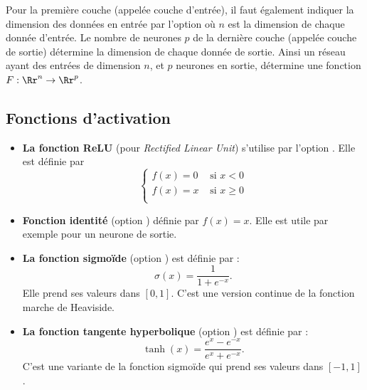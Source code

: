 \documentclass[11pt,class=report,crop=false]{standalone}
\begin{document}
Pour la première couche (appelée couche d'entrée), il faut également indiquer la dimension des données en entrée par l'option  où $n$ est la dimension de chaque donnée d'entrée.
Le nombre de neurones $p$ de la dernière couche (appelée couche de sortie) détermine la dimension de chaque donnée de sortie. Ainsi un réseau ayant des entrées de dimension $n$, et $p$ neurones en sortie, détermine une fonction $F : \Rr^n \to \Rr^p$.



\subsection{Fonctions d'activation}


\begin{itemize}
  \item \textbf{La fonction ReLU} (pour \emph{Rectified Linear Unit}) s'utilise par l'option . Elle est   définie par 
  $$\begin{cases}
  f(x) = 0 & \text{ si } x < 0 \\
  f(x) = x  & \text{ si } x \ge 0 \\
  \end{cases}$$

  \item \textbf{Fonction identité} (option ) définie par $f(x) = x$. Elle est utile par exemple pour un neurone de sortie.
  
  \item \textbf{La fonction sigmoïde} (option ) est définie par :
  $$\sigma(x) = \frac{1}{1+e^{-x}}.$$
  Elle prend ses valeurs dans $[0,1]$.
  C'est une version continue de la fonction marche de Heaviside.
    
  \item \textbf{La fonction tangente hyperbolique}
  (option ) est définie par :
  $$\tanh(x) = \frac{e^{x}-e^{-x}}{e^{x}+e^{-x}}.$$
  C'est une variante de la fonction sigmoïde qui prend ses valeurs dans $[-1,1]$.
  
\end{itemize}


\begin{minipage}{0.45\textwidth}
\end{minipage}
\begin{minipage}{0.45\textwidth}
\end{minipage}
\end{document}
